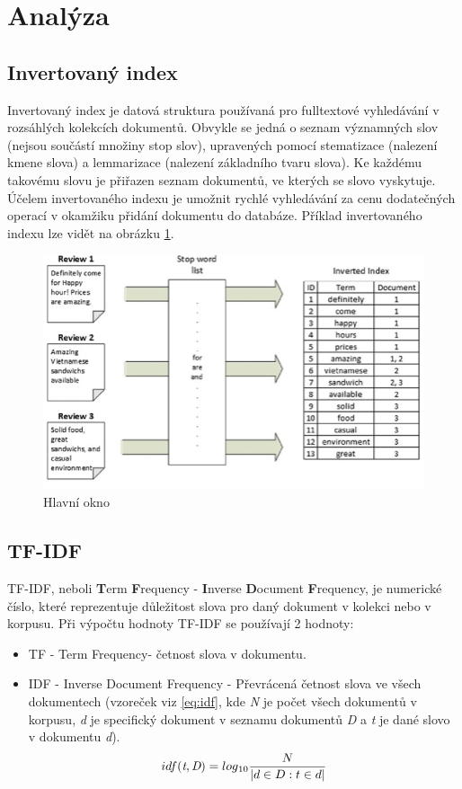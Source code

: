\documentclass[12pt, a4paper]{article}
\begin{document}
\section{Analýza}
\subsection{Invertovaný index}
Invertovaný index je datová struktura používaná pro fulltextové vyhledávání v rozsáhlých kolekcích dokumentů. Obvykle se jedná o seznam významných slov (nejsou součástí množiny stop slov), upravených pomocí stematizace (nalezení kmene slova) a lemmarizace (nalezení základního tvaru slova). Ke každému takovému slovu je přiřazen seznam dokumentů, ve kterých se slovo vyskytuje. Účelem invertovaného indexu je umožnit rychlé vyhledávání za cenu dodatečných operací v okamžiku přidání dokumentu do databáze. Příklad invertovaného indexu lze vidět na obrázku \ref{fig:index}.
\begin{figure}[h]
	\centering
	\includegraphics[width=14cm]{img/inverted_index.png}
	\caption{Hlavní okno}
	\label{fig:index}
\end{figure}
\newpage
\subsection{TF-IDF}
TF-IDF, neboli \textbf{T}erm \textbf{F}requency - \textbf{I}nverse \textbf{D}ocument \textbf{F}requency, je numerické číslo, které reprezentuje důležitost slova pro daný dokument v kolekci nebo v korpusu. Při výpočtu hodnoty TF-IDF se používají 2 hodnoty:
\begin{itemize}
\item {TF} - Term Frequency- četnost slova v dokumentu.
\item {IDF} - Inverse Document Frequency - Převrácená četnost slova ve všech dokumentech (vzoreček viz \ref{eq:idf}, kde \textit{N} je počet všech dokumentů v korpusu, \textit{d} je specifický dokument v seznamu dokumentů \textit{D} a \textit{t} je dané slovo v dokumentu \textit{d}).
\begin{equation}
idf(\textit{t},\textit{D}) = log\textsubscript{10} \frac{N}{| d \in D : t \in d |}
\label{eq:idf} 
\end{equation}
\end{itemize}
\end{document}
